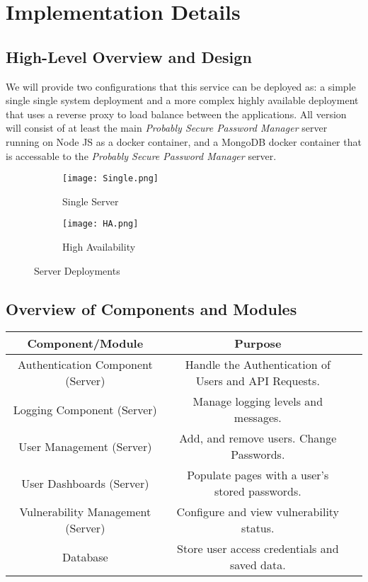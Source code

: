 
\section{Implementation Details}
\subsection{High-Level Overview and Design}
We will provide two configurations that this service can be deployed as: a simple single single system deployment and a more complex highly available deployment that uses a reverse proxy to load balance between the applications. All version will consist of at least the main \textit{Probably Secure Password Manager} server running on Node JS as a docker container, and a MongoDB docker container that is accessable to the \textit{Probably Secure Password Manager} server.

\begin{figure}[h]
  \centering
  \begin{subfigure}{0.45\textwidth}
    \centering
    \texttt{[image: Single.png]}
    \caption{Single Server}
  \end{subfigure}
  \hfill
  \begin{subfigure}{0.45\textwidth}
    \centering
    \texttt{[image: HA.png]}
    \caption{High Availability}
  \end{subfigure}
  \caption{Server Deployments}
\end{figure}



\subsection{Overview of Components and Modules}

\begin{tabular}{|c|c|c|}
    \hline
    \textbf{Component/Module}& \textbf{Purpose}\\
    \hline
    Authentication Component (Server) & Handle the Authentication of Users and API Requests.\\ 
    \hline
    Logging Component (Server) & Manage logging levels and messages.\\
    \hline
    User Management (Server) & Add, and remove users. Change Passwords.\\
    \hline
    User Dashboards (Server) & Populate pages with a user's stored passwords.\\
    \hline
    Vulnerability Management (Server) & Configure and view vulnerability status.\\
    \hline
    Database & Store user access credentials and saved data.\\
    \hline
\end{tabular}

